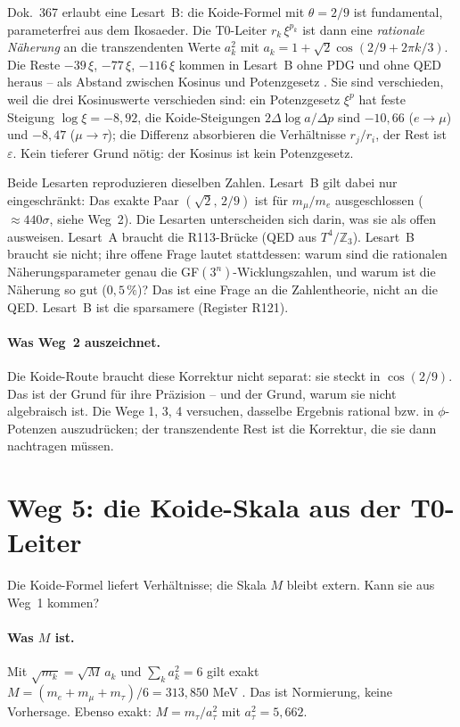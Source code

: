 Dok.~367 erlaubt eine Lesart~B: die Koide-Formel mit $\theta=2/9$ ist
fundamental, parameterfrei aus dem Ikosaeder. Die T0-Leiter $r_k\,\xi^{p_k}$ ist
dann eine \emph{rationale Näherung} an die transzendenten Werte
$a_k^2$ mit $a_k = 1+\sqrt2\cos(2/9+2\pi k/3)$. Die Reste
$-39\,\xi$, $-77\,\xi$, $-116\,\xi$ kommen in Lesart~B ohne PDG und ohne QED
heraus -- als Abstand zwischen Kosinus und Potenzgesetz \KM. Sie sind
verschieden, weil die drei Kosinuswerte verschieden sind: ein Potenzgesetz
$\xi^{p}$ hat feste Steigung $\log\xi=-8{,}92$, die Koide-Steigungen
$2\Delta\log a/\Delta p$ sind $-10{,}66$ ($e\to\mu$) und $-8{,}47$ ($\mu\to\tau$);
die Differenz absorbieren die Verhältnisse $r_j/r_i$, der Rest ist
$\varepsilon$. Kein tieferer Grund nötig: der Kosinus ist kein Potenzgesetz.

Beide Lesarten reproduzieren dieselben Zahlen. Lesart~B gilt dabei nur
eingeschränkt: Das exakte Paar $(\sqrt2,\,2/9)$ ist für $m_\mu/m_e$
ausgeschlossen (${\approx}440\sigma$, siehe Weg~2). Die Lesarten unterscheiden sich darin,
was sie als offen ausweisen. Lesart~A braucht die R113-Brücke (QED aus
$T^4/\mathbb{Z}_3$). Lesart~B braucht sie nicht; ihre offene Frage lautet
stattdessen: warum sind die rationalen Näherungsparameter genau die
GF$(3^n)$-Wicklungszahlen, und warum ist die Näherung so gut ($0{,}5\,\%$)?
Das ist eine Frage an die Zahlentheorie, nicht an die QED. Lesart~B ist die
sparsamere (Register R121).

\paragraph{Was Weg~2 auszeichnet.}
Die Koide-Route braucht diese Korrektur nicht separat: sie steckt in
$\cos(2/9)$. Das ist der Grund für ihre Präzision -- und der Grund, warum sie
nicht algebraisch ist. Die Wege 1, 3, 4 versuchen, dasselbe Ergebnis rational bzw.
in $\phi$-Potenzen auszudrücken; der transzendente Rest ist die Korrektur, die sie
dann nachtragen müssen.

\section{Weg 5: die Koide-Skala aus der T0-Leiter}

Die Koide-Formel liefert Verhältnisse; die Skala $M$ bleibt extern. Kann sie
aus Weg~1 kommen?

\paragraph{Was $M$ ist.}
Mit $\sqrt{m_k} = \sqrt{M}\,a_k$ und $\sum_k a_k^2 = 6$ gilt exakt
$M = (m_e+m_\mu+m_\tau)/6 = 313{,}850$ MeV \BM. Das ist Normierung, keine
Vorhersage. Ebenso exakt: $M = m_\tau/a_\tau^2$ mit $a_\tau^2 = 5{,}662$.

